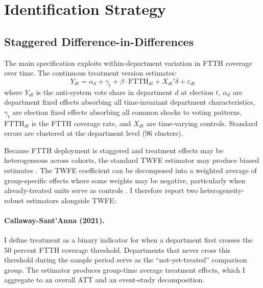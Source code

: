 \documentclass[12pt]{article}
\begin{document}

\section{Identification Strategy}\label{sec:identification}

\subsection{Staggered Difference-in-Differences}

The main specification exploits within-department variation in FTTH coverage over time. The continuous treatment version estimates:
\begin{equation}\label{eq:twfe}
Y_{dt} = \alpha_d + \gamma_t + \beta \cdot \text{FTTH}_{dt} + X_{dt}'\delta + \varepsilon_{dt}
\end{equation}
where $Y_{dt}$ is the anti-system vote share in department $d$ at election $t$, $\alpha_d$ are department fixed effects absorbing all time-invariant department characteristics, $\gamma_t$ are election fixed effects absorbing all common shocks to voting patterns, $\text{FTTH}_{dt}$ is the FTTH coverage rate, and $X_{dt}$ are time-varying controls. Standard errors are clustered at the department level (96 clusters).

Because FTTH deployment is staggered and treatment effects may be heterogeneous across cohorts, the standard TWFE estimator may produce biased estimates \citep{goodman2021difference, dechaisemartin2020two}. The TWFE coefficient can be decomposed into a weighted average of group-specific effects where some weights may be negative, particularly when already-treated units serve as controls \citep{borusyak2024revisiting}. I therefore report two heterogeneity-robust estimators alongside TWFE:

\paragraph{Callaway-Sant'Anna (2021).} I define treatment as a binary indicator for when a department first crosses the 50 percent FTTH coverage threshold. Departments that never cross this threshold during the sample period serve as the ``not-yet-treated'' comparison group. The \citet{callaway2021difference} estimator produces group-time average treatment effects, which I aggregate to an overall ATT and an event-study decomposition.
\end{document}
